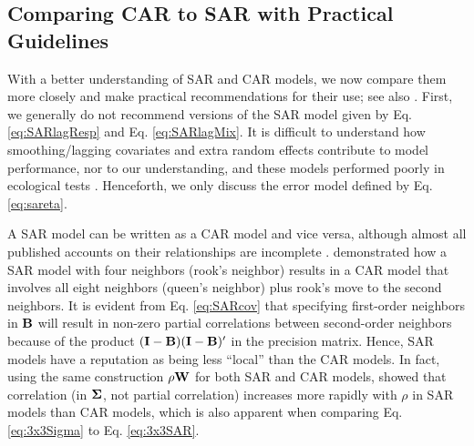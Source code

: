 \documentclass[11pt, titlepage]{article}\usepackage[]{graphicx}\usepackage[]{color}
\begin{document}
\begin{spacing}{1.9}
\begin{flushleft}
\subsection*{Comparing CAR to SAR with Practical Guidelines}

With a better understanding of SAR and CAR models, we now compare them more closely and make practical recommendations for their use; see also \citet{Wall:clos:2004}. First, we generally do not recommend versions of the SAR model given by Eq. \ref{eq:SARlagResp} and Eq. \ref{eq:SARlagMix}.  It is difficult to understand how smoothing/lagging covariates and extra random effects contribute to model performance, nor to our understanding, and these models performed poorly in ecological tests \citep{Dorm:etal:meth:2007, Kiss:Carl:spat:2008}. Henceforth, we only discuss the error model defined by Eq. \ref{eq:sareta}. 

A SAR model can be written as a CAR model and vice versa, although almost all published accounts on their relationships are incomplete \citep{Ver:Hank:Hoot:2017}. \citet[pg. 408]{Cres:stat:1993} demonstrated how a SAR model with four neighbors (rook's neighbor) results in a CAR model that involves all eight neighbors (queen's neighbor) plus rook's move to the second neighbors. It is evident from Eq. \ref{eq:SARcov} that specifying first-order neighbors in $\mathbf{B}$ will result in non-zero partial correlations between second-order neighbors because of the product $(\mathbf{I} - \mathbf{B})(\mathbf{I} - \mathbf{B})^{\prime}$ in the precision matrix.  Hence, SAR models have a reputation as being less ``local'' than the CAR models.  In fact, using the same construction $\rho\mathbf{W}$ for both SAR and CAR models, \citet{Wall:clos:2004} showed that correlation (in $\mbox{\boldmath $\Sigma$}$, not partial correlation) increases more rapidly with $\rho$ in SAR models than CAR models, which is also apparent when comparing Eq. \ref{eq:3x3Sigma} to Eq. \ref{eq:3x3SAR}. 


\end{flushleft}
\end{spacing}
\end{document}
